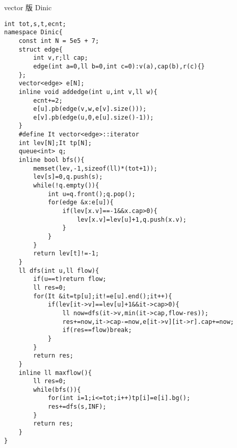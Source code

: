 \documentclass{ctexart}
\begin{document}
vector 版 Dinic
\begin{lstlisting}
int tot,s,t,ecnt;
namespace Dinic{
    const int N = 5e5 + 7;
    struct edge{
        int v,r;ll cap;
        edge(int a=0,ll b=0,int c=0):v(a),cap(b),r(c){}
    };
    vector<edge> e[N];
    inline void addedge(int u,int v,ll w){
        ecnt+=2;
        e[u].pb(edge(v,w,e[v].size()));
        e[v].pb(edge(u,0,e[u].size()-1));
    }
    #define It vector<edge>::iterator
    int lev[N];It tp[N];
    queue<int> q;
    inline bool bfs(){
        memset(lev,-1,sizeof(ll)*(tot+1));
        lev[s]=0,q.push(s);
        while(!q.empty()){
            int u=q.front();q.pop();
            for(edge &x:e[u]){
                if(lev[x.v]==-1&&x.cap>0){
                    lev[x.v]=lev[u]+1,q.push(x.v);
                }
            }
        }
        return lev[t]!=-1;
    }
    ll dfs(int u,ll flow){
        if(u==t)return flow;
        ll res=0;
        for(It &it=tp[u];it!=e[u].end();it++){
            if(lev[it->v]==lev[u]+1&&it->cap>0){
                ll now=dfs(it->v,min(it->cap,flow-res));
                res+=now,it->cap-=now,e[it->v][it->r].cap+=now;
                if(res==flow)break;
            }
        }
        return res;
    }
    inline ll maxflow(){
        ll res=0;
        while(bfs()){
            for(int i=1;i<=tot;i++)tp[i]=e[i].bg();
            res+=dfs(s,INF);
        }
        return res;
    }
}
\end{lstlisting}
\end{document}
